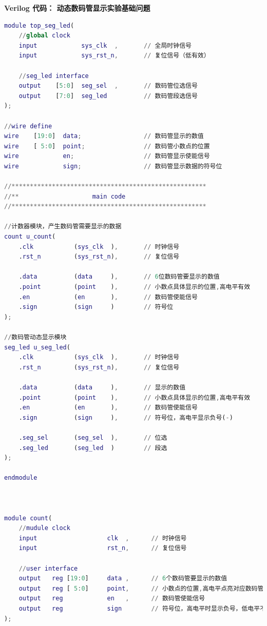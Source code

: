 \documentclass[UTF8]{article}
\theoremstyle{MyLineTheoremStyle} %
\theoremstyle{MyBlockTheoremStyle} %
\theoremstyle{MySubsubsectionStyle} %
\begin{document}
\textbf{Verilog 代码： 动态数码管显示实验基础问题}
\begin{lstlisting}[language=Matlab, style=MatlabStyle_src]
module top_seg_led(
    //global clock
    input            sys_clk  ,       // 全局时钟信号
    input            sys_rst_n,       // 复位信号（低有效）

    //seg_led interface
    output    [5:0]  seg_sel  ,       // 数码管位选信号
    output    [7:0]  seg_led          // 数码管段选信号
);

//wire define
wire    [19:0]  data;                 // 数码管显示的数值
wire    [ 5:0]  point;                // 数码管小数点的位置
wire            en;                   // 数码管显示使能信号
wire            sign;                 // 数码管显示数据的符号位

//*****************************************************
//**                    main code
//*****************************************************

//计数器模块，产生数码管需要显示的数据
count u_count(
    .clk           (sys_clk  ),       // 时钟信号
    .rst_n         (sys_rst_n),       // 复位信号

    .data          (data     ),       // 6位数码管要显示的数值
    .point         (point    ),       // 小数点具体显示的位置,高电平有效
    .en            (en       ),       // 数码管使能信号
    .sign          (sign     )        // 符号位
);

//数码管动态显示模块
seg_led u_seg_led(
    .clk           (sys_clk  ),       // 时钟信号
    .rst_n         (sys_rst_n),       // 复位信号

    .data          (data     ),       // 显示的数值
    .point         (point    ),       // 小数点具体显示的位置,高电平有效
    .en            (en       ),       // 数码管使能信号
    .sign          (sign     ),       // 符号位，高电平显示负号(-)
    
    .seg_sel       (seg_sel  ),       // 位选
    .seg_led       (seg_led  )        // 段选
);

endmodule



module count(
    //mudule clock
    input                   clk  ,      // 时钟信号
    input                   rst_n,      // 复位信号
    
    //user interface
    output   reg [19:0]     data ,      // 6个数码管要显示的数值
    output   reg [ 5:0]     point,      // 小数点的位置,高电平点亮对应数码管位上的小数点
    output   reg            en   ,      // 数码管使能信号
    output   reg            sign        // 符号位，高电平时显示负号，低电平不显示负号
);


\end{lstlisting}
\end{document}
